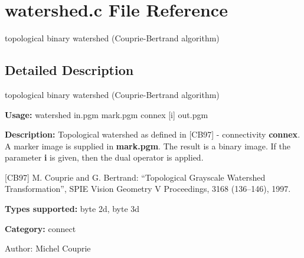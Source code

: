 \section{watershed.c File Reference}
\label{watershed_8c}
topological binary watershed (Couprie-Bertrand algorithm) 



\subsection{Detailed Description}
topological binary watershed (Couprie-Bertrand algorithm) 

{\bf Usage:} watershed in.pgm mark.pgm connex [i] out.pgm

{\bf Description:} Topological watershed as defined in [CB97] - connectivity {\bf connex}. A marker image is supplied in {\bf mark.pgm}. The result is a binary image. If the parameter {\bf i} is given, then the dual operator is applied.

[CB97] M. Couprie and G. Bertrand: ``Topological Grayscale Watershed Transformation'', SPIE Vision Geometry V Proceedings, 3168 (136--146), 1997.

{\bf Types supported:} byte 2d, byte 3d

{\bf Category:} connect

\begin{Desc}
\item[Author:]Michel Couprie \end{Desc}

